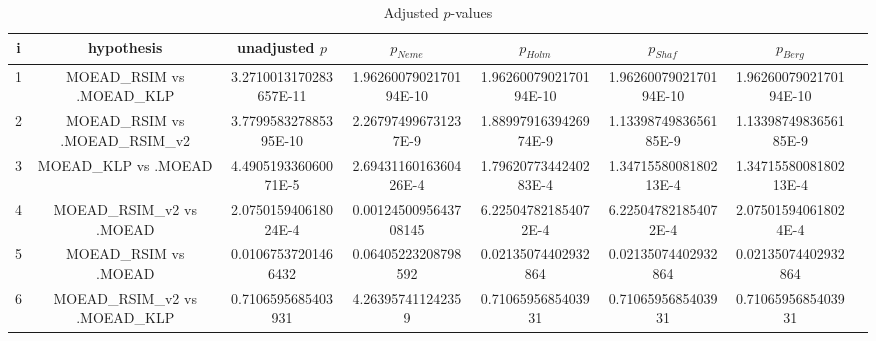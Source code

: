 \documentclass[a4paper,10pt]{article}
\begin{document}
\begin{landscape}
\begin{table}[!htp]
\centering\tiny
\caption{Adjusted $p$-values}
\begin{tabular}{cccccccc}
i&hypothesis&unadjusted $p$&$p_{Neme}$&$p_{Holm}$&$p_{Shaf}$&$p_{Berg}$\\
\hline
1&MOEAD_RSIM vs .MOEAD_KLP&3.2710013170283657E-11&1.9626007902170194E-10&1.9626007902170194E-10&1.9626007902170194E-10&1.9626007902170194E-10\\
2&MOEAD_RSIM vs .MOEAD_RSIM_v2&3.779958327885395E-10&2.267974996731237E-9&1.8899791639426974E-9&1.1339874983656185E-9&1.1339874983656185E-9\\
3&MOEAD_KLP vs .MOEAD&4.490519336060071E-5&2.6943116016360426E-4&1.7962077344240283E-4&1.3471558008180213E-4&1.3471558008180213E-4\\
4&MOEAD_RSIM_v2 vs .MOEAD&2.075015940618024E-4&0.0012450095643708145&6.225047821854072E-4&6.225047821854072E-4&2.075015940618024E-4\\
5&MOEAD_RSIM vs .MOEAD&0.01067537201466432&0.06405223208798592&0.02135074402932864&0.02135074402932864&0.02135074402932864\\
6&MOEAD_RSIM_v2 vs .MOEAD_KLP&0.7106595685403931&4.263957411242359&0.7106595685403931&0.7106595685403931&0.7106595685403931\\
\hline
\end{tabular}
\end{table}

\end{landscape}
\end{document}
